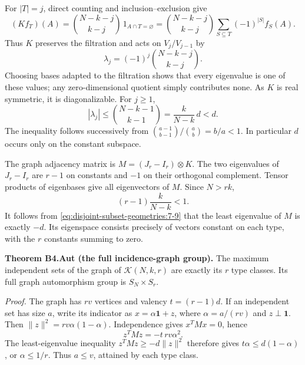 For \(|T|=j\), direct counting and inclusion--exclusion give \begin{equation}
(Kf_T)(A)=\binom{N-k-j}{k-j}\,1_{A\cap T=\varnothing}
=\binom{N-k-j}{k-j}\sum_{S\subseteq T}(-1)^{|S|}f_S(A).
\label{eq:disjoint-subset-geometries:7-7}
\end{equation} Thus \(K\) preserves the filtration and acts on \(V_j/V_{j-1}\) by \begin{equation}
\lambda_j=(-1)^j\binom{N-k-j}{k-j}.
\label{eq:disjoint-subset-geometries:7-8}
\end{equation} Choosing bases adapted to the filtration shows that every eigenvalue is one of these values; any zero-dimensional quotient simply contributes none. As \(K\) is real symmetric, it is diagonalizable. For \(j\geq1\), \begin{equation}
|\lambda_j|\leq\binom{N-k-1}{k-1}
=\frac{k}{N-k}\,d<d.
\label{eq:disjoint-subset-geometries:7-9}
\end{equation} The inequality follows successively from \(\binom{a-1}{b-1}/\binom ab=b/a<1\). In particular \(d\) occurs only on the constant subspace.

The graph adjacency matrix is \(M=(J_r-I_r)\otimes K\). The two eigenvalues of \(J_r-I_r\) are \(r-1\) on constants and \(-1\) on their orthogonal complement. Tensor products of eigenbases give all eigenvectors of \(M\). Since \(N>rk\), \begin{equation}
(r-1)\frac{k}{N-k}<1.
\label{eq:disjoint-subset-geometries:7-10}
\end{equation} It follows from \eqref{eq:disjoint-subset-geometries:7-9} that the least eigenvalue of \(M\) is exactly \(-d\). Its eigenspace consists precisely of vectors constant on each type, with the \(r\) constants summing to zero.

\textbf{Theorem B4.Aut (the full incidence-graph group).} The maximum independent sets of the graph of \(\mathcal K(N,k,r)\) are exactly its \(r\) type classes. Its full graph automorphism group is \(S_N\times S_r\).

\emph{Proof.} The graph has \(rv\) vertices and valency \(t=(r-1)d\). If an independent set has size \(a\), write its indicator as \(x=\alpha\mathbf1+z\), where \(\alpha=a/(rv)\) and \(z\perp\mathbf1\). Then \(\|z\|^2=rv\alpha(1-\alpha)\). Independence gives \(x^TMx=0\), hence \[
z^TMz=-t\,rv\alpha^2.
\] The least-eigenvalue inequality \(z^TMz\geq-d\|z\|^2\) therefore gives \(t\alpha\leq d(1-\alpha)\), or \(\alpha\leq1/r\). Thus \(a\leq v\), attained by each type class.

